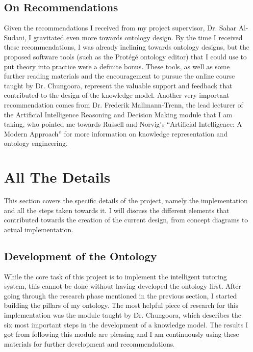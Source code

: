 \documentclass[titlepage]{article}
\begin{document}
\subsection{On Recommendations}
Given the recommendations I received from my project supervisor, Dr. Sahar Al-Sudani, I gravitated even more towards ontology design. By the time I received these recommendations, I was already inclining towards ontology designs, but the proposed software tools (such as the Prot\'eg\'e ontology editor) that I could use to put theory into practice were a definite bonus. These tools, as well as some further reading materials\cite{owlprotg} and the encouragement to pursue the online course taught by Dr. Chungoora, represent the valuable support and feedback that contributed to the design of the knowledge model.
\newline
Another very important recommendation comes from Dr. Frederik Mallmann-Trenn, the lead lecturer of the Artificial Intelligence Reasoning and Decision Making module that I am taking, who pointed me towards Russell and Norvig's ``Artificial Intelligence: A Modern Approach''  for more information on knowledge representation and ontology engineering.
\newpage
\section{All The Details}
This section covers the specific details of the project, namely the implementation and all the steps taken towards it. I will discuss the different elements that contributed towards the creation of the current design, from concept diagrams to actual implementation.

\subsection{Development of the Ontology}
While the core task of this project is to implement the intelligent tutoring system, this cannot be done without having developed the ontology first. After going through the research phase mentioned in the previous section, I started building the pillars of my ontology.
\newline
The most helpful piece of research for this implementation was the module taught by Dr. Chungoora, which describes the six most important steps in the development of a knowledge model. The results I got from following this module are pleasing and I am continuously using these materials for further development and recommendations.
\end{document}
